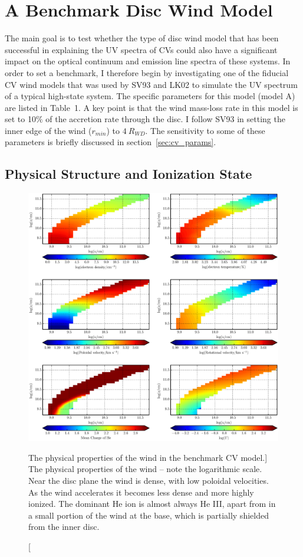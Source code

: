 \nocite{walker1963}

\section{A Benchmark Disc Wind Model}
\label{modela}

The main goal is to test whether the type of disc wind model that has
been successful in explaining the UV spectra of CVs could also have a
significant impact on the optical continuum and emission line spectra
of these systems. In order to set a benchmark, I therefore begin by
investigating one of the fiducial CV wind models that was used by SV93
and LK02 to simulate the UV spectrum of a typical high-state
system. The specific parameters for this model (model A) are listed in
Table~1. A key point is that the wind mass-loss rate in this model is
set to 10$\%$ of the accretion rate through the disc. I follow SV93
in setting the inner edge of the wind ($r_{min}$) to $4~R_{WD}$. 
The sensitivity to some of these parameters is briefly discussed in
section~\ref{sec:cv_params}. 

\subsection{Physical Structure and Ionization State}
\label{modela_ionization}

\begin{figure}
\includegraphics[width=1.0\textwidth]{figures/05-cvpaper/fig5.eps}
\caption
[The physical properties of the wind in the benchmark CV model.]
{
The physical properties of the wind -- note the logarithmic scale. 
Near the disc plane the wind is dense, with low poloidal velocities.
As the wind accelerates it becomes less dense
and more highly ionized. The dominant He ion
is almost always He III, apart from in a small
portion of the wind at the base, which is partially shielded
from the inner disc.
}
\label{wind}
\end{figure}

